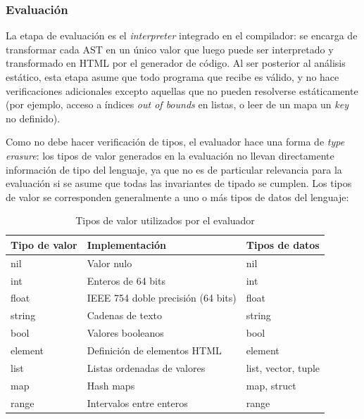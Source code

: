 \subsubsection{Evaluación}

La etapa de evaluación es el \textit{interpreter} integrado en el compilador: se encarga de transformar cada AST en un único valor que luego puede ser interpretado y transformado en HTML por el generador de código. Al ser posterior al análisis estático, esta etapa asume que todo programa que recibe es válido, y no hace verificaciones adicionales excepto aquellas que no pueden resolverse estáticamente (por ejemplo, acceso a índices \textit{out of bounds} en listas, o leer de un mapa un \textit{key} no definido).

Como no debe hacer verificación de tipos, el evaluador hace una forma de \textit{type erasure}: los tipos de valor generados en la evaluación no llevan directamente información de tipo del lenguaje, ya que no es de particular relevancia para la evaluación si se asume que todas las invariantes de tipado se cumplen. Los tipos de valor se corresponden generalmente a uno o más tipos de datos del lenguaje:

\begin{table}[H]
\centering
\begin{tabular}{|l|l|l|}
\hline
\textbf{Tipo de valor} & \textbf{Implementación}            & \textbf{Tipos de datos} \\ \hline
nil                    & Valor nulo                         & nil                     \\ \hline
int                    & Enteros de 64 bits                 & int                     \\ \hline
float                  & IEEE 754 doble precisión (64 bits) & float                   \\ \hline
string                 & Cadenas de texto                   & string                  \\ \hline
bool                   & Valores booleanos                  & bool                    \\ \hline
element                & Definición de elementos HTML       & element                 \\ \hline
list                   & Listas ordenadas de valores        & list, vector, tuple     \\ \hline
map                    & Hash maps                          & map, struct             \\ \hline
range                  & Intervalos entre enteros           & range                   \\ \hline
\end{tabular}
\caption{Tipos de valor utilizados por el evaluador}
\label{tab:value_types}
\end{table}

